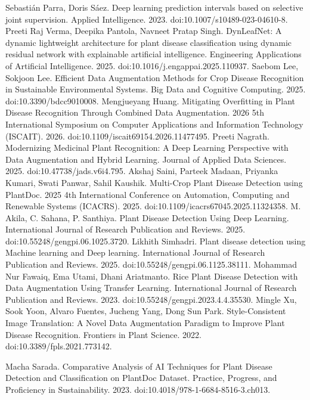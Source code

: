  Sebastián Parra, Doris Sáez. Deep learning prediction intervals based on selective joint supervision. Applied Intelligence. 2023. doi:10.1007/s10489-023-04610-8.
 Preeti Raj Verma, Deepika Pantola, Navneet Pratap Singh. DynLeafNet: A dynamic lightweight architecture for plant disease classification using dynamic residual network with explainable artificial intelligence. Engineering Applications of Artificial Intelligence. 2025. doi:10.1016/j.engappai.2025.110937.
 Saebom Lee, Sokjoon Lee. Efficient Data Augmentation Methods for Crop Disease Recognition in Sustainable Environmental Systems. Big Data and Cognitive Computing. 2025. doi:10.3390/bdcc9010008.
 Mengjueyang Huang. Mitigating Overfitting in Plant Disease Recognition Through Combined Data Augmentation. 2026 5th International Symposium on Computer Applications and Information Technology (ISCAIT). 2026. doi:10.1109/iscait69154.2026.11477495.
 Preeti Nagrath. Modernizing Medicinal Plant Recognition: A Deep Learning Perspective with Data Augmentation and Hybrid Learning. Journal of Applied Data Sciences. 2025. doi:10.47738/jads.v6i4.795.
 Akshaj Saini, Parteek Madaan, Priyanka Kumari, Swati Panwar, Sahil Kaushik. Multi-Crop Plant Disease Detection using PlantDoc. 2025 4th International Conference on Automation, Computing and Renewable Systems (ICACRS). 2025. doi:10.1109/icacrs67045.2025.11324358.
 M. Akila, C. Sahana, P. Santhiya. Plant Disease Detection Using Deep Learning. International Journal of Research Publication and Reviews. 2025. doi:10.55248/gengpi.06.1025.3720.
 Likhith Simhadri. Plant disease detection using Machine learning and Deep learning. International Journal of Research Publication and Reviews. 2025. doi:10.55248/gengpi.06.1125.38111.
 Mohammad Nur Fawaiq, Ema Utami, Dhani Ariatmanto. Rice Plant Disease Detection with Data Augmentation Using Transfer Learning. International Journal of Research Publication and Reviews. 2023. doi:10.55248/gengpi.2023.4.4.35530.
 Mingle Xu, Sook Yoon, Alvaro Fuentes, Jucheng Yang, Dong Sun Park. Style-Consistent Image Translation: A Novel Data Augmentation Paradigm to Improve Plant Disease Recognition. Frontiers in Plant Science. 2022. doi:10.3389/fpls.2021.773142.

 Macha Sarada. Comparative Analysis of AI Techniques for Plant Disease Detection and Classification on PlantDoc Dataset. Practice, Progress, and Proficiency in Sustainability. 2023. doi:10.4018/978-1-6684-8516-3.ch013.

